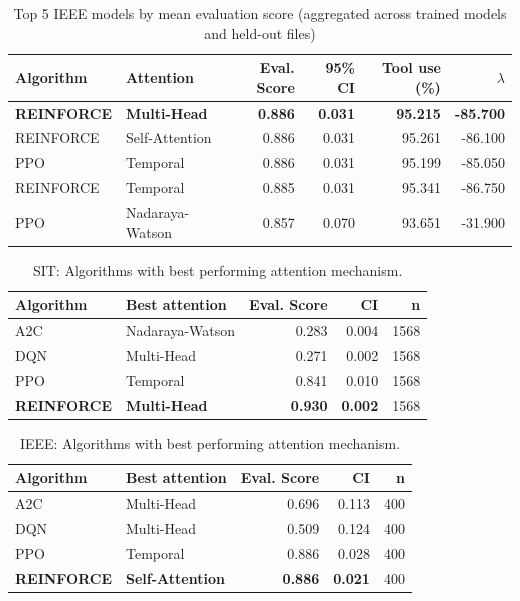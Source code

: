 \documentclass[sn-basic]{sn-jnl} %
\begin{document}
\begin{table}[htbp]
	\centering
	\caption{Top 5 IEEE models by mean evaluation score (aggregated across trained models and held-out files)}
	\label{tab:ieee_top10}
	\begin{tabular}{ll r r r r}
	\toprule
	\textbf{Algorithm} & \textbf{Attention} & \textbf{Eval. Score} & \textbf{95\% CI} & \textbf{Tool use (\%)} & \textbf{$\lambda$}\\
	\midrule
	\textbf{REINFORCE} & \textbf{Multi-Head} & \textbf{0.886} & \textbf{0.031} & \textbf{95.215} & \textbf{-85.700}\\
	REINFORCE & Self-Attention 	& 0.886 & 0.031 & 95.261 & -86.100\\
	PPO & Temporal 				& 0.886 & 0.031 & 95.199 & -85.050\\
	REINFORCE & Temporal 		& 0.885 & 0.031 & 95.341 & -86.750\\
	PPO & Nadaraya-Watson 	& 0.857 & 0.070 & 93.651 & -31.900\\
	\bottomrule
	\end{tabular}
\end{table}


\begin{table}
	\caption{SIT: Algorithms with best performing attention mechanism.}
	\label{tab:sit_best_attn}
	\begin{tabular}{l l r r r}
	\toprule
	\textbf{Algorithm} & \textbf{Best attention} & \textbf{Eval. Score} & \textbf{CI} & \textbf{n}\\
	\midrule
		A2C & Nadaraya-Watson & 0.283 & 0.004 & 1568 \\
		DQN & Multi-Head & 0.271 & 0.002 & 1568 \\
		PPO & Temporal & 0.841 & 0.010 & 1568 \\
		\textbf{REINFORCE} & \textbf{Multi-Head} & \textbf{0.930} & \textbf{0.002} & 1568 \\
	\bottomrule
	\end{tabular}
\end{table}

\begin{table}[htbp]
	\centering
	\caption{IEEE: Algorithms with best performing attention mechanism.}
	\label{tab:ieee_best_attn}
	\begin{tabular}{l l r r r}
	\toprule
	\textbf{Algorithm} & \textbf{Best attention} & \textbf{Eval. Score} & \textbf{CI} & \textbf{n}\\
	\midrule
		A2C & Multi-Head & 0.696 & 0.113 & 400 \\
		DQN & Multi-Head & 0.509 & 0.124 & 400 \\
		PPO & Temporal & 0.886 & 0.028 & 400 \\
		\textbf{REINFORCE} & \textbf{Self-Attention} & \textbf{0.886} & \textbf{0.021} & 400 \\
	\bottomrule
	\end{tabular}
\end{table}
\end{document}

